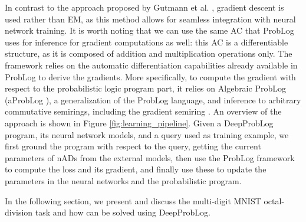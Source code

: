 In contrast to the approach proposed by Gutmann et al. \cite{Gutmann}, gradient descent is used rather than EM, as this method allows for seamless integration with neural network training. It is worth noting that we can use the same AC that ProbLog uses for inference for gradient computations as well: this AC is a differentiable structure, as it is composed of addition and multiplication operations only. The framework relies on the automatic differentiation capabilities already available in ProbLog to derive the gradients. More specifically, to compute the gradient with respect to the probabilistic logic program part, it relies on Algebraic ProbLog (aProbLog \cite{aProbLog}), a generalization of the ProbLog language, and inference to arbitrary commutative semirings, including the gradient semiring \cite{gSemiring}.
An overview of the approach is shown in Figure \ref{fig:learning_pipeline}.
Given a DeepProbLog program, its neural network models, and a query used as training example, we first ground the program with respect to the query, getting the current parameters of nADs from the external models, then use the ProbLog framework to compute the loss and its gradient, and finally use these to update the parameters in the neural networks and the probabilistic program. %



In the following section, we present and discuss the multi-digit MNIST octal-division task and how can be solved using DeepProbLog.